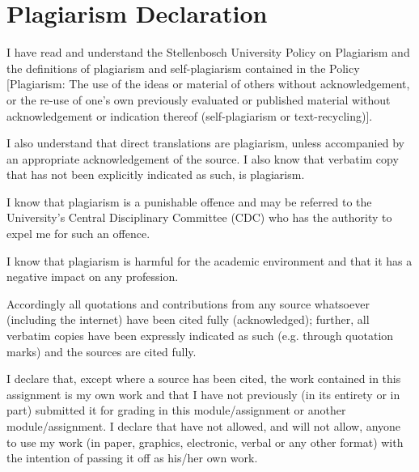 \documentclass[12pt,a4paper]{article}
\begin{document}
\setcounter{page}{1}
\fancyfoot[C]{\thepage}
        
\section*{Plagiarism Declaration}
I have read and understand the Stellenbosch University Policy on Plagiarism and the definitions of plagiarism and self-plagiarism contained in the Policy [Plagiarism: The use of the ideas or material of others without acknowledgement, or the re-use of one's own previously evaluated or published material without acknowledgement or indication thereof (self-plagiarism or text-\-re\-cyc\-ling)].

I also understand that direct translations are plagiarism, unless accompanied by an appropriate acknowledgement of the source. I also know that verbatim copy that has not been explicitly indicated as such, is plagiarism.

I know that plagiarism is a punishable offence and may be referred to the University's Central Disciplinary Committee (CDC) who has the authority to expel me for such an offence.

I know that plagiarism is harmful for the academic environment and that it has a negative impact on any profession.

Accordingly all quotations and contributions from any source whatsoever (including the internet) have been cited fully (acknowledged); further, all verbatim copies have been expressly indicated as such (e.g. through quotation marks) and the sources are cited fully.

I declare that, except where a source has been cited, the work contained in this assignment is my own work and that I have not previously (in its entirety or in part) submitted it for grading in this module/assignment or another module/assignment.
I declare that have not allowed, and will not allow, anyone to use my work (in paper, graphics, electronic, verbal or any other format) with the intention of passing it off as his/her own work.
\end{document}
